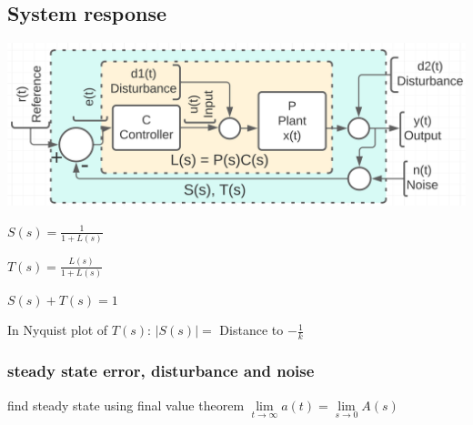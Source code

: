 \subsection{System response}
    \includegraphics[width = \linewidth]{src/images/basic_block_chart.png}
    \begin{minipage}{0.33\linewidth}
        \begin{center}
            $S(s) = \frac{1}{1 + L(s)}$
        \end{center}
    \end{minipage}
    \begin{minipage}{0.33\linewidth}
        \begin{center}
            $T(s) = \frac{L(s)}{1 + L(s)}$
        \end{center}
    \end{minipage}
    \begin{minipage}{0.31\linewidth}
        \hfill \break \hfill \break
        $S(s) + T(s) = 1$
    \end{minipage}
    In Nyquist plot of $T(s)$: $|S(s)| = $ Distance to $- \frac{1}{k}$
    
    \subsubsection{steady state error, disturbance and noise}
    find steady state using final value theorem $\lim\limits_{t \rightarrow \infty} a(t) = \lim\limits_{s \rightarrow 0} A(s)$

